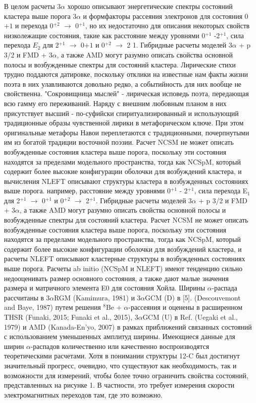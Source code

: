 \documentclass[fontsize=14pt]{scrreport}
\begin{document}
В целом расчеты 3$\alpha$ хорошо описывают энергетические спектры состояний кластера выше порога 3$\alpha$ и формфакторы рассеяния электронов для состояния 0${+1}$ и перехода 0$^{+2}$ $\rightarrow$ 0$^{+1}$, но их недостаточно для описания некоторых свойств низколежащие состояния, такие как расстояние между уровнями 0$^{+1}$ -2$^{+1}$, сила перехода $E_{2}$ для 2$^{+1}$ $\rightarrow$ 0${+1}$ и 0$^{+2}$ $\rightarrow$ 2 1. Гибридные расчеты моделей 3$\alpha$ + p 3/2 и FMD + 3$\alpha$, а также AMD могут разумно описать свойства основной полосы и возбужденные спектры для состояний кластера. 
Лирические стихи трудно поддаются датировке, поскольку отклики на известные нам факты жизни поэта в них улавливаются довольно редко, а событийность для них вообще не свойственна. "Сокровищница мыслей" - лирическая исповедь поэта, передающая всю гамму его переживаний. Наряду с внешним любовным планом в них присутствует высший - по-суфийски спиритуализированный и использующий традиционные образы чувственной лирики в метафорическом ключе. При этом оригинальные метафоры Навои переплетаются с традиционными, почерпнутыми им из богатой традиции восточной поэзии. 
Расчет NCSM не может описать возбужденные состояния кластера выше порога, поскольку эти состояния находятся за пределами модельного пространства, тогда как NCSpM, который содержит более высокие конфигурации оболочки для возбуждений кластера, и вычисления NLEFT описывают структуры кластера в возбужденных состояниях выше порога. например, расстояние между уровнями 0$^{+1}$ - 2$^{+1}$, сила перехода E$_{1}$ для 2$^{+1}$ $\rightarrow$ 0$^{+1}$ и 0$^{+2}$ $\rightarrow$ 2$^{+1}$. Гибридные расчеты моделей 3$\alpha$ + p 3/2 и FMD + 3$\alpha$, а также AMD могут разумно описать свойства основной полосы и возбужденные спектры для состояний кластера. Расчет NCSM не может описать возбужденные состояния кластера выше порога, поскольку эти состояния находятся за пределами модельного пространства, тогда как NCSpM, который содержит более высокие конфигурации оболочки для возбуждений кластера, и расчеты NLEFT описывают кластерные структуры в возбужденных состояниях выше порога. Расчеты ab initio (NCSpM и NLEFT) имеют тенденцию сильно недооценивать размер основного состояния, а также дают малые значения размера и матричного элемента E0 для состояния Хойла. Ширины $\alpha$-распада рассчитаны в 3$\alpha$RGM (Kamimura, 1981) и 3$\alpha$GCM (D) в [5]. (Descouvemont and Baye, 1987) путем решения $^{8}$Be + $\alpha$-рассеяния и оценены в расширенном THSR (Funaki, 2015; Funaki et al., 2015), 3$\alpha$GCM (U) в Ref. (Uegaki et al., 1979) и AMD (Kanada-En'yo, 2007) в рамках приближений связанных состояний с использованием уменьшенных амплитуд ширины. Имеющиеся данные для ширин $\alpha$-распадов количественно или качественно воспроизводятся теоретическими расчетами. Хотя в понимании структуры 12-C был достигнут значительный прогресс, очевидно, что существуют как необходимость, так и возможности для измерений, чтобы более точно ограничить свойства состояний, представленных на рисунке 1. В частности, это требует измерения скорости электромагнитных переходов там, где это возможно.
\end{document}
